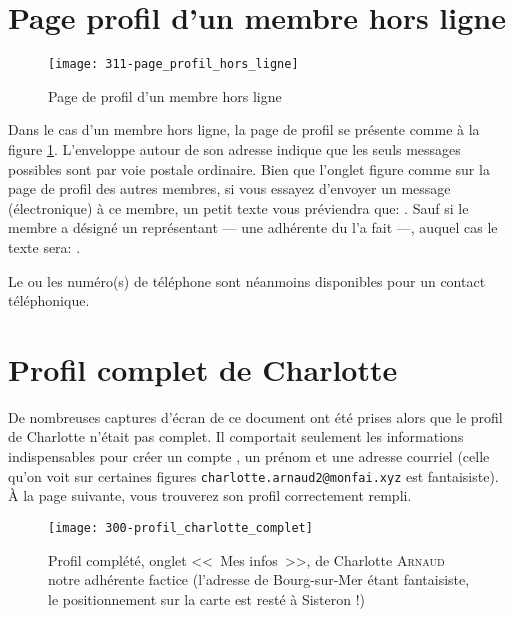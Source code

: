 \section{Page profil d'un membre \og hors ligne\fg}
\label{sec:profilMembreHorsLigne}
\begin{figure}
    \centering
    \texttt{[image: 311-page\_profil\_hors\_ligne]}
    \caption{Page de profil d'un membre \og hors ligne\fg}
    \label{fig:pageProfilHorsLigne}
\end{figure}

Dans le cas d'un membre \og hors ligne\fg, la page de profil se présente comme à la figure \ref{fig:pageProfilHorsLigne}. L'enveloppe autour de son adresse indique que les seuls messages possibles sont par voie postale ordinaire. Bien que l'onglet  figure comme sur la page de profil des autres membres, si vous essayez d'envoyer un message (électronique) à ce membre, un petit texte vous préviendra que: . Sauf si le membre a désigné un représentant --- une adhérente du \CdS l'a fait ---, auquel cas le texte sera: .

Le ou les numéro(s) de téléphone sont néanmoins disponibles pour un contact téléphonique.

\section{Profil complet de Charlotte}

De nombreuses captures d'écran de ce document ont été prises alors que le profil de Charlotte n'était pas complet. Il comportait seulement les informations indispensables pour créer un compte \CF, un prénom et une adresse courriel (celle qu'on voit sur certaines figures \texttt{charlotte.arnaud2@monfai.xyz} est fantaisiste). À la page suivante, vous trouverez son profil correctement rempli.

\begin{figure}
    \centering
    \texttt{[image: 300-profil\_charlotte\_complet]}
    \caption[Profil complet de Charlotte \textsc{Arnaud}]{Profil complété, onglet <<~Mes infos~>>, de Charlotte \textsc{Arnaud} notre adhérente factice  (l'adresse de Bourg-sur-Mer étant fantaisiste, le positionnement sur la carte est resté à Sisteron !)}
    \label{fig:profilCharlotteComplet}
\end{figure}


